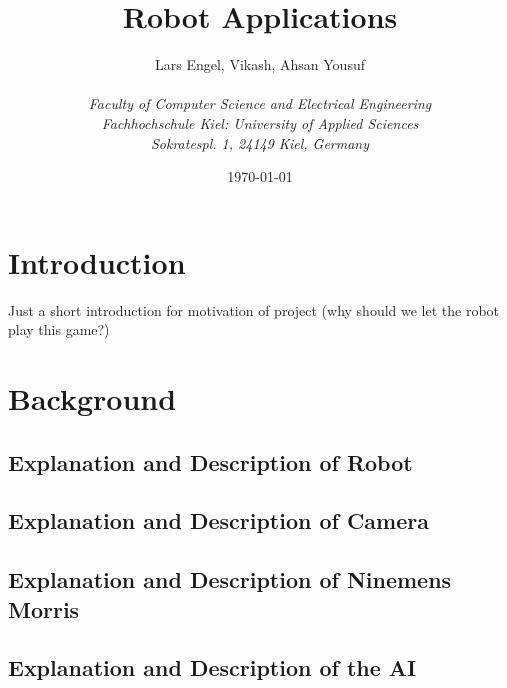 \documentclass[a4paper]{spie}  %
\title{Robot Applications}
\author{Lars Engel, Vikash, Ahsan Yousuf
\\\textit{\\Faculty of Computer Science and Electrical Engineering
\\Fachhochschule Kiel: University of Applied Sciences\\ Sokratespl. 1, 24149 Kiel, Germany}
}
\date{\today}
\begin{document}
 
  
  \begin{LARGE}
  \maketitle
  \end{LARGE}
  \vspace{60pt}
  \begin{large}
  \tableofcontents
  \newpage



\section{Introduction}
Just a short introduction for motivation of project (why should we let the robot play this game?)
\clearpage
\section{Background}
\subsection{Explanation and Description of Robot}
\subsection{Explanation and Description of Camera}
\subsection{Explanation and Description of Ninemens Morris}
\subsection{Explanation and Description of the AI}

\end{large}
\end{document}
